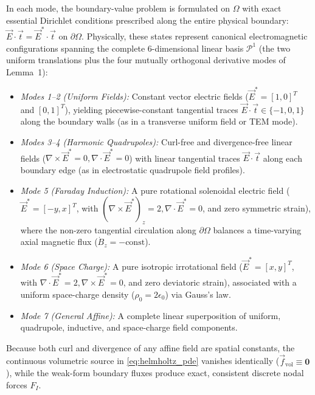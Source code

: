 \documentclass[VANCOUVER,Times1COL]{WileyNJD-v5}
\begin{document}
In each mode, the boundary-value problem is formulated on $\Omega$ with exact essential Dirichlet conditions prescribed along the entire physical boundary: $\vec{E} \cdot \vec{t} = \vec{E}^* \cdot \vec{t}$ on $\partial\Omega$. Physically, these states represent canonical electromagnetic configurations spanning the complete 6-dimensional linear basis $\mathcal{P}^1$ (the two uniform translations plus the four mutually orthogonal derivative modes of Lemma~1):
\begin{itemize}
    \item \textit{Modes 1--2 (Uniform Fields):} Constant vector electric fields ($\vec{E}^* = [1, 0]^T$ and $[0, 1]^T$), yielding piecewise-constant tangential traces $\vec{E} \cdot \vec{t} \in \{-1, 0, 1\}$ along the boundary walls (as in a transverse uniform field or TEM mode).
    \item \textit{Modes 3--4 (Harmonic Quadrupoles):} Curl-free and divergence-free linear fields ($\nabla \times \vec{E}^* = 0, \nabla \cdot \vec{E}^* = 0$) with linear tangential traces $\vec{E} \cdot \vec{t}$ along each boundary edge (as in electrostatic quadrupole field profiles).
    \item \textit{Mode 5 (Faraday Induction):} A pure rotational solenoidal electric field ($\vec{E}^* = [-y, x]^T$, with $(\nabla \times \vec{E}^*)_z = 2, \nabla \cdot \vec{E}^* = 0$, and zero symmetric strain), where the non-zero tangential circulation along $\partial\Omega$ balances a time-varying axial magnetic flux ($\dot{B}_z = -\mathrm{const}$).
    \item \textit{Mode 6 (Space Charge):} A pure isotropic irrotational field ($\vec{E}^* = [x, y]^T$, with $\nabla \cdot \vec{E}^* = 2, \nabla \times \vec{E}^* = 0$, and zero deviatoric strain), associated with a uniform space-charge density ($\rho_0 = 2\epsilon_0$) via Gauss's law.
    \item \textit{Mode 7 (General Affine):} A complete linear superposition of uniform, quadrupole, inductive, and space-charge field components.
\end{itemize}
Because both curl and divergence of any affine field are spatial constants, the continuous volumetric source in \eqref{eq:helmholtz_pde} vanishes identically ($\vec{f}_{\mathrm{vol}} \equiv \mathbf{0}$), while the weak-form boundary fluxes produce exact, consistent discrete nodal forces $F_I$.
\end{document}

